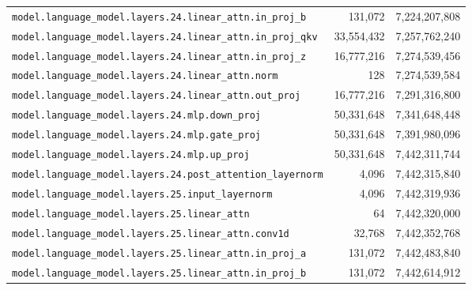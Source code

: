 \documentclass[10pt,a4paper]{article}
\theoremstyle{definition}
\begin{document}
\begin{appendices}
\begin{longtable}{p{9.5cm}rr}
\texttt{model.\allowbreak{}language\_model.\allowbreak{}layers.\allowbreak{}24.\allowbreak{}linear\_attn.\allowbreak{}in\_proj\_b} & 131,072 & 7,224,207,808 \\
\texttt{model.\allowbreak{}language\_model.\allowbreak{}layers.\allowbreak{}24.\allowbreak{}linear\_attn.\allowbreak{}in\_proj\_qkv} & 33,554,432 & 7,257,762,240 \\
\texttt{model.\allowbreak{}language\_model.\allowbreak{}layers.\allowbreak{}24.\allowbreak{}linear\_attn.\allowbreak{}in\_proj\_z} & 16,777,216 & 7,274,539,456 \\
\texttt{model.\allowbreak{}language\_model.\allowbreak{}layers.\allowbreak{}24.\allowbreak{}linear\_attn.\allowbreak{}norm} & 128 & 7,274,539,584 \\
\texttt{model.\allowbreak{}language\_model.\allowbreak{}layers.\allowbreak{}24.\allowbreak{}linear\_attn.\allowbreak{}out\_proj} & 16,777,216 & 7,291,316,800 \\
\texttt{model.\allowbreak{}language\_model.\allowbreak{}layers.\allowbreak{}24.\allowbreak{}mlp.\allowbreak{}down\_proj} & 50,331,648 & 7,341,648,448 \\
\texttt{model.\allowbreak{}language\_model.\allowbreak{}layers.\allowbreak{}24.\allowbreak{}mlp.\allowbreak{}gate\_proj} & 50,331,648 & 7,391,980,096 \\
\texttt{model.\allowbreak{}language\_model.\allowbreak{}layers.\allowbreak{}24.\allowbreak{}mlp.\allowbreak{}up\_proj} & 50,331,648 & 7,442,311,744 \\
\texttt{model.\allowbreak{}language\_model.\allowbreak{}layers.\allowbreak{}24.\allowbreak{}post\_attention\_layernorm} & 4,096 & 7,442,315,840 \\
\texttt{model.\allowbreak{}language\_model.\allowbreak{}layers.\allowbreak{}25.\allowbreak{}input\_layernorm} & 4,096 & 7,442,319,936 \\
\texttt{model.\allowbreak{}language\_model.\allowbreak{}layers.\allowbreak{}25.\allowbreak{}linear\_attn} & 64 & 7,442,320,000 \\
\texttt{model.\allowbreak{}language\_model.\allowbreak{}layers.\allowbreak{}25.\allowbreak{}linear\_attn.\allowbreak{}conv1d} & 32,768 & 7,442,352,768 \\
\texttt{model.\allowbreak{}language\_model.\allowbreak{}layers.\allowbreak{}25.\allowbreak{}linear\_attn.\allowbreak{}in\_proj\_a} & 131,072 & 7,442,483,840 \\
\texttt{model.\allowbreak{}language\_model.\allowbreak{}layers.\allowbreak{}25.\allowbreak{}linear\_attn.\allowbreak{}in\_proj\_b} & 131,072 & 7,442,614,912 \\

\end{longtable}
\end{appendices}
\end{document}

